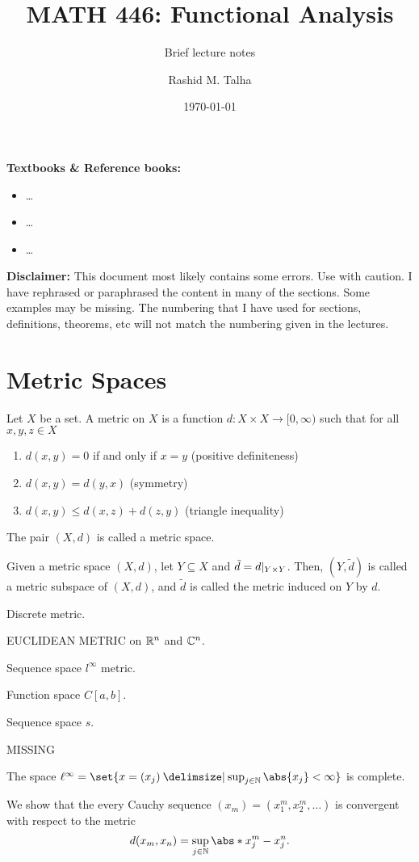 \documentclass[11pt]{penrose}
\title{MATH 446: Functional Analysis}
\subtitle{Brief lecture notes}
\author{Rashid M. Talha}
\affiliation{School of Natural Sciences, NUST}
\date{\today}
\begin{document}
\maketitle

\textbf{Textbooks \& Reference books:}
\begin{itemize}
    \item \dots
    \item \dots
    \item \dots
\end{itemize}

\textbf{Disclaimer:} This document most likely contains some errors. Use with caution. I have rephrased or paraphrased the content in many of the sections. Some examples may be missing. The numbering that I have used for sections, definitions, theorems, etc will not match the numbering given in the lectures.

\section{Metric Spaces}
\begin{ndfn}
    Let $X$ be a set. A metric on $X$ is a function $d : X \times X \to [0,\infty)$ such that for all $x, y, z \in X$
    \begin{enumerate}
        \item $d(x,y) = 0$ if and only if $x = y$ \hfill (positive definiteness)
        \item $d(x,y) = d(y,x)$ \hfill (symmetry)
        \item $d(x,y) \leq d(x,z) + d(z,y)$ \hfill (triangle inequality)
    \end{enumerate}
    The pair $(X,d)$ is called a metric space.
\end{ndfn}

\begin{ndfn}
    Given a metric space $(X,d)$, let $Y \subseteq X$ and $\tilde{d} = d \at{Y \times Y}$. Then, $(Y,\tilde{d})$ is called a metric subspace of $(X,d)$, and $\tilde{d}$ is called the metric induced on $Y$ by $d$.
\end{ndfn}

Discrete metric.

EUCLIDEAN METRIC on $\mathbb{R}^n$ and $\mathbb{C}^n$.

Sequence space $l^{\infty}$ metric.

Function space $C[a,b]$.

Sequence space $s$.

MISSING

\begin{negg}
    The space $\ell^{\infty} = \set{x = (x_{j}) \st \sup_{j \in \N} \abs{x_{j}} < \infty}$ is complete.

    We show that the every Cauchy sequence $(x_{m}) = (x^{m}_{1}, x^{m}_{2}, \dots)$ is convergent with respect to the metric
    \begin{equation*}
        d(x_{m}, x_{n}) = \sup_{j \in \N} \abs*{x^{m}_{j} - x^{n}_{j}}.
    \end{equation*}
\end{negg}
\end{document}
